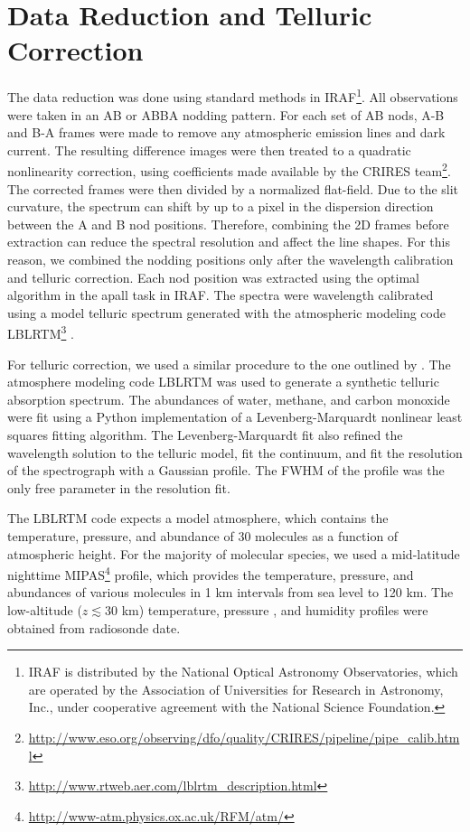 \documentclass[11pt]{report}     %
\begin{document}
\section{Data Reduction and Telluric Correction}
\label{sec:reduction}
The data reduction was done using standard methods in
IRAF\footnote{IRAF is distributed by the National Optical Astronomy Observatories,
    which are operated by the Association of Universities for Research
    in Astronomy, Inc., under cooperative agreement with the National
    Science Foundation.}. All observations were taken in an AB or ABBA nodding
pattern. For each set of AB nods, A-B and B-A frames were made to
remove any atmospheric emission lines and dark current. The resulting
difference images were then treated to a quadratic nonlinearity correction, using
coefficients made available by the CRIRES
team\footnote{\url{http://www.eso.org/observing/dfo/quality/CRIRES/pipeline/pipe_calib.html}}. 
The corrected frames were then divided by a normalized flat-field. Due
to the slit curvature, the spectrum can shift by up to a pixel in
the dispersion direction between the A and B nod positions. Therefore,
combining the 2D frames before extraction can reduce the spectral
resolution and affect the line shapes. For this reason, we
combined the nodding positions only after the wavelength
calibration and telluric correction. Each nod position was extracted using the 
optimal algorithm in the apall task in IRAF. The spectra were wavelength 
calibrated using a model telluric
spectrum generated with the atmospheric modeling code
LBLRTM\footnote{\url{http://www.rtweb.aer.com/lblrtm_description.html}}
\citep{Clough2005}.


For telluric correction, we used a similar procedure to the one outlined by
\cite{Seifahrt2011}. The atmosphere modeling code
LBLRTM was used to generate a synthetic telluric
absorption spectrum. The abundances of water,
methane, and carbon monoxide were fit using a Python implementation of
a Levenberg-Marquardt nonlinear least squares fitting algorithm. The
Levenberg-Marquardt fit also refined the wavelength solution to the
telluric model, fit the continuum, and fit the resolution of the
spectrograph with a Gaussian profile. The FWHM of the profile was the
only free parameter in the resolution fit.

The LBLRTM code expects a model atmosphere, which contains the
temperature, pressure, and abundance of 30 molecules as a
function of atmospheric height. For the majority of molecular species,
we used a mid-latitude nighttime
MIPAS\footnote{\url{http://www-atm.physics.ox.ac.uk/RFM/atm/} }
profile, which provides the temperature, pressure, and abundances of
various molecules in 1 km intervals from sea level to 120 km. The
low-altitude ($z \lesssim 30$ km)
temperature, pressure \citep{Kerber2010}, and humidity
\citep{Chac2010} profiles were obtained from radiosonde date.
\end{document}
